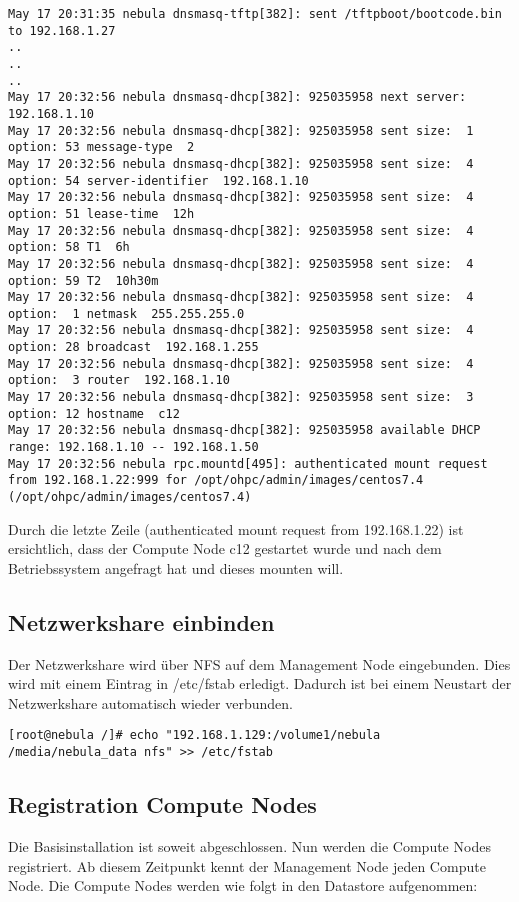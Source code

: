 \begin{lstlisting}
May 17 20:31:35 nebula dnsmasq-tftp[382]: sent /tftpboot/bootcode.bin to 192.168.1.27
..
..
..
May 17 20:32:56 nebula dnsmasq-dhcp[382]: 925035958 next server: 192.168.1.10
May 17 20:32:56 nebula dnsmasq-dhcp[382]: 925035958 sent size:  1 option: 53 message-type  2
May 17 20:32:56 nebula dnsmasq-dhcp[382]: 925035958 sent size:  4 option: 54 server-identifier  192.168.1.10
May 17 20:32:56 nebula dnsmasq-dhcp[382]: 925035958 sent size:  4 option: 51 lease-time  12h
May 17 20:32:56 nebula dnsmasq-dhcp[382]: 925035958 sent size:  4 option: 58 T1  6h
May 17 20:32:56 nebula dnsmasq-dhcp[382]: 925035958 sent size:  4 option: 59 T2  10h30m
May 17 20:32:56 nebula dnsmasq-dhcp[382]: 925035958 sent size:  4 option:  1 netmask  255.255.255.0
May 17 20:32:56 nebula dnsmasq-dhcp[382]: 925035958 sent size:  4 option: 28 broadcast  192.168.1.255
May 17 20:32:56 nebula dnsmasq-dhcp[382]: 925035958 sent size:  4 option:  3 router  192.168.1.10
May 17 20:32:56 nebula dnsmasq-dhcp[382]: 925035958 sent size:  3 option: 12 hostname  c12
May 17 20:32:56 nebula dnsmasq-dhcp[382]: 925035958 available DHCP range: 192.168.1.10 -- 192.168.1.50
May 17 20:32:56 nebula rpc.mountd[495]: authenticated mount request from 192.168.1.22:999 for /opt/ohpc/admin/images/centos7.4 (/opt/ohpc/admin/images/centos7.4)
\end{lstlisting}

Durch die letzte Zeile (authenticated mount request from 192.168.1.22) ist ersichtlich, dass der Compute Node c12 gestartet wurde und nach dem Betriebssystem angefragt hat und dieses mounten will.
\newpage

\subsection{Netzwerkshare einbinden}

Der Netzwerkshare wird über NFS auf dem Management Node eingebunden. Dies wird mit einem Eintrag in /etc/fstab erledigt. Dadurch ist bei einem Neustart der Netzwerkshare automatisch wieder verbunden.
\begin{lstlisting}
[root@nebula /]# echo "192.168.1.129:/volume1/nebula /media/nebula_data nfs" >> /etc/fstab
\end{lstlisting}

\subsection{Registration Compute Nodes}

Die Basisinstallation ist soweit abgeschlossen. Nun werden die Compute Nodes registriert. Ab diesem Zeitpunkt kennt der Management Node jeden Compute Node. Die Compute Nodes werden wie folgt in den Datastore aufgenommen:

